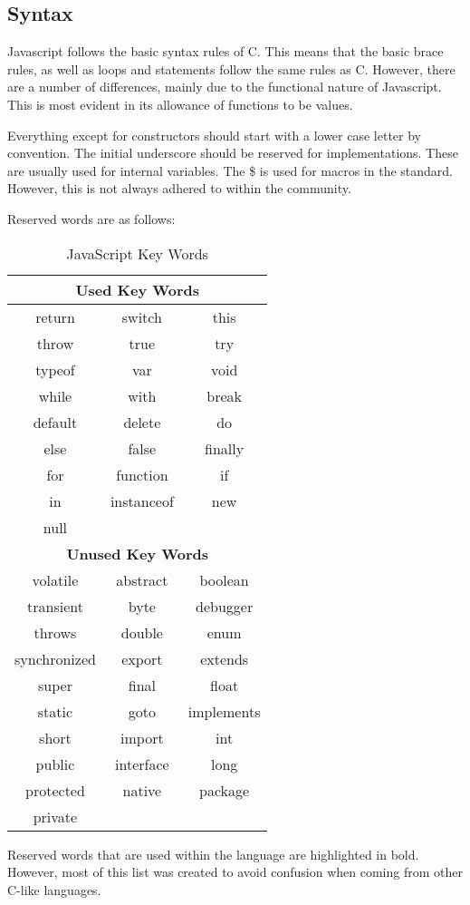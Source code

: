 		\subsection{Syntax}
			Javascript follows the basic syntax rules of C. 
			This means that the basic brace rules, as well as loops and statements follow the same rules as C. 
			However, there are a number of differences, mainly due to the functional nature of Javascript. 
			This is most evident in its allowance of functions to be values. 

			Everything except for constructors should start with a lower case letter by convention. 
			The initial underscore should be reserved for implementations. 
			These are usually used for internal variables. 
			The \$ is used for macros in the standard. 
			However, this is not always adhered to within the community. 

			Reserved words are as follows:
			\begin{table}[htb]
				\centering
				\begin{tabular}{|c|c|c|}
					\hline
					\multicolumn{3}{|c|}{\textbf{Used Key Words}} \\ \hline
					return & switch & this \\ \hline
					throw & true & try \\ \hline
					typeof & var & void \\ \hline
					while & with & break \\ \hline
					default & delete & do \\ \hline 
					else & false & finally \\ \hline 
					for & function & if \\ \hline 
					in & instanceof & new  \\ \hline
					null & & \\ \hline
					\hline
					\multicolumn{3}{|c|}{\textbf{Unused Key Words}} \\ \hline
					volatile & abstract & boolean \\ \hline
					transient & byte & debugger \\ \hline
					throws & double & enum \\ \hline
					synchronized & export & extends \\ \hline
					super & final & float \\ \hline
					static & goto & implements \\ \hline
					short & import & int \\ \hline
					public & interface & long \\ \hline
					protected & native & package \\ \hline
					private & & \\ \hline
				 \end{tabular}
				 \caption{JavaScript Key Words}
				 \label{tab:JSKeyWords}
			 \end{table}
			Reserved words that are used within the language are highlighted in bold. 
			However, most of this list was created to avoid confusion when coming from other C-like languages. 

